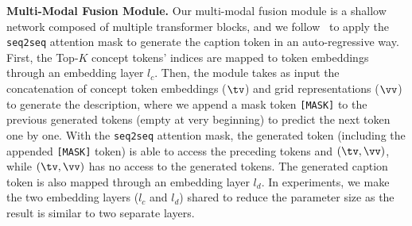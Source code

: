 \vspace{1mm}
\noindent \textbf{Multi-Modal Fusion Module.}
\label{sec:multimodal}
Our multi-modal fusion module is a shallow network composed of multiple transformer blocks, and we follow~\citep{radford2018improving,brown2020language} to apply the \texttt{seq2seq} attention mask to generate the caption token in an auto-regressive way.
First, the Top-$K$ concept tokens' indices are mapped to token embeddings through an embedding layer $l_c$.
Then, the module takes as input the concatenation of concept token embeddings ($\tv$) and grid representations ($\vv$) to generate the description, where we append a mask token \texttt{[MASK]} to the previous generated tokens (empty at very beginning) to predict the next token one by one.
With the \texttt{seq2seq} attention mask, the generated token (including the appended \texttt{[MASK]} token) is able to access the preceding tokens and $(\tv, \vv)$, while $(\tv, \vv)$ has no access to the generated tokens.  
The generated caption token is also mapped through an embedding layer $l_d$.
In experiments, we make the two embedding layers ($l_c$ and $l_d$) shared to reduce the parameter size as the result is similar to two separate layers. 





